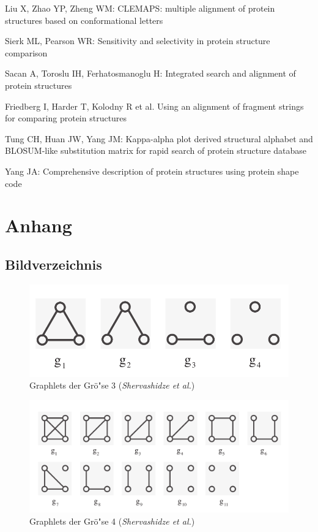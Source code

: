 \documentclass{report}
\begin{document}
Liu X, Zhao YP, Zheng WM: CLEMAPS: multiple alignment of protein structures based on conformational letters

Sierk ML, Pearson WR: Sensitivity and selectivity in protein structure comparison

Sacan A, Toroslu IH, Ferhatosmanoglu H: Integrated search and alignment of protein structures

Friedberg I, Harder T, Kolodny R et al. Using an alignment of fragment strings for comparing protein structures

Tung CH, Huan JW, Yang JM: Kappa-alpha plot derived structural alphabet and BLOSUM-like substitution matrix for rapid search of protein structure database






Yang JA: Comprehensive description of protein structures using protein shape code




\chapter{Anhang}


\section{Bildverzeichnis}

\begin{figure}[h!]
\includegraphics[width =\linewidth]{3graphlets.pdf}
\caption{Graphlets der Gr\"o"se 3 (\textit{Shervashidze et al.})}
\label{fig:3graphlets}
\end{figure}

\begin{figure}[h!]
\includegraphics[width =\linewidth]{4graphlets.pdf}
\caption{Graphlets der Gr\"o"se 4 (\textit{Shervashidze et al.})}
\label{fig:4graphlets2}
\end{figure}
\end{document}
